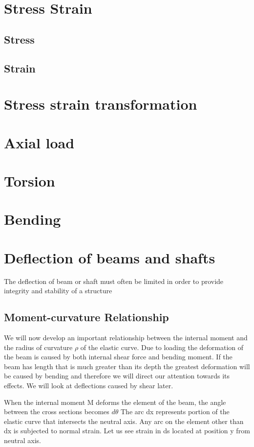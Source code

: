 \documentclass{report}
\begin{document}
\tableofcontents
\chapter{Stress Strain}
\section{Stress}
\section{Strain}
\chapter{Stress strain transformation}
\chapter{Axial load}
\chapter{Torsion}
\chapter{Bending}
\chapter{Deflection of beams and shafts}
The deflection of beam or shaft must often be limited in order to provide integrity and
stability of a structure
\section{Moment-curvature Relationship}
We will now develop an important relationship between the internal moment and the radius of curvature \(\rho\) of the 
elastic curve. Due to loading the deformation of the beam is caused by both internal shear force and bending moment. If the 
beam has length that is much greater than its depth the greatest deformation will be caused by bending and therefore we will
direct our attention towards its effects. We will look at deflections caused by shear later.


When the internal moment M deforms the element of the beam, the angle between the cross sections becomes \(d\theta\) 
The arc dx represents portion of the elastic curve that intersects the neutral axis. Any arc on the element other than dx is subjected to normal strain.
Let us see strain in ds located at position y from neutral axis.
\end{document}
